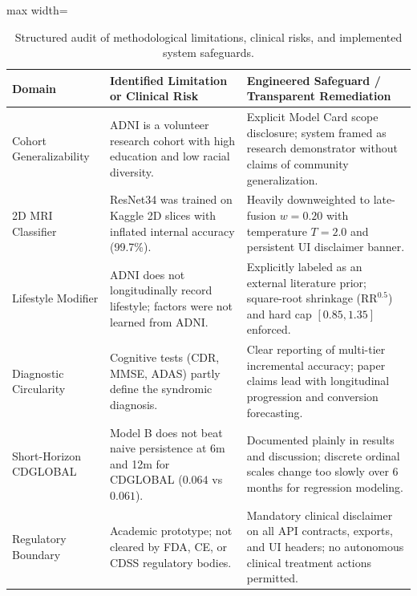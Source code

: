 \begin{table}[t]
\centering
\caption{Structured audit of methodological limitations, clinical risks, and implemented system safeguards.}
\label{tab:limitations}
\small
\begin{adjustbox}{max width=\linewidth}
\begin{tabular}{p{3.0cm}p{5.5cm}p{6.5cm}}
\toprule
\textbf{Domain} & \textbf{Identified Limitation or Clinical Risk} & \textbf{Engineered Safeguard / Transparent Remediation} \\
\midrule
Cohort Generalizability & ADNI is a volunteer research cohort with high education and low racial diversity. & Explicit Model Card scope disclosure; system framed as research demonstrator without claims of community generalization. \\
2D MRI Classifier       & ResNet34 was trained on Kaggle 2D slices with inflated internal accuracy (99.7\%). & Heavily downweighted to late-fusion $w=0.20$ with temperature $T=2.0$ and persistent UI disclaimer banner. \\
Lifestyle Modifier      & ADNI does not longitudinally record lifestyle; factors were not learned from ADNI. & Explicitly labeled as an external literature prior; square-root shrinkage ($\text{RR}^{0.5}$) and hard cap $[0.85, 1.35]$ enforced. \\
Diagnostic Circularity  & Cognitive tests (CDR, MMSE, ADAS) partly define the syndromic diagnosis. & Clear reporting of multi-tier incremental accuracy; paper claims lead with longitudinal progression and conversion forecasting. \\
Short-Horizon CDGLOBAL  & Model B does not beat naive persistence at 6m and 12m for CDGLOBAL ($0.064$ vs $0.061$). & Documented plainly in results and discussion; discrete ordinal scales change too slowly over 6 months for regression modeling. \\
Regulatory Boundary     & Academic prototype; not cleared by FDA, CE, or CDSS regulatory bodies. & Mandatory clinical disclaimer on all API contracts, exports, and UI headers; no autonomous clinical treatment actions permitted. \\
\bottomrule
\end{tabular}
\end{adjustbox}
\end{table}

